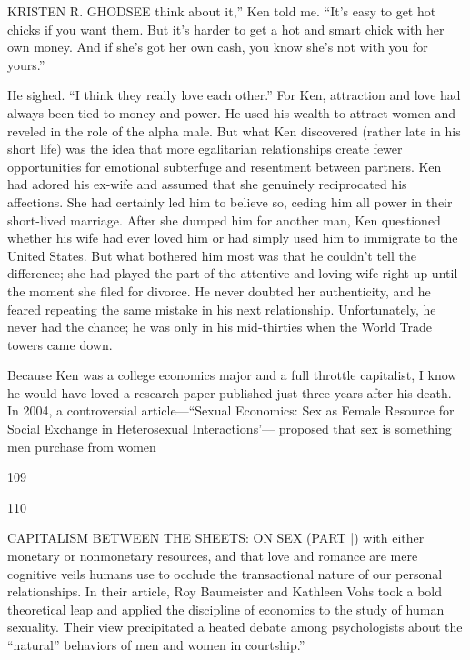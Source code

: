  \par 
KRISTEN R. GHODSEE think about it,” Ken told me. “It’s easy to get hot chicks if you want them. But it’s harder to get a hot and smart chick with her own money. And if she’s got her own cash, you know she’s not with you for yours.”
 \par 
He sighed. “I think they really love each other.” For Ken, attraction and love had always been tied to money and power. He used his wealth to attract women and reveled in the role of the alpha male. But what Ken discovered (rather late in his short life) was the idea that more egalitarian relationships create fewer opportunities for emotional subterfuge and resentment between partners. Ken had adored his ex-wife and assumed that she genuinely reciprocated his affections. She had certainly led him to believe so, ceding him all power in their short-lived marriage. After she dumped him for another man, Ken questioned whether his wife had ever loved him or had simply used him to immigrate to the United States. But what bothered him most was that he couldn’t tell the difference; she had played the part of the attentive and loving wife right up until the moment she filed for divorce. He never doubted her authenticity, and he feared repeating the same mistake in his next relationship. Unfortunately, he never had the chance; he was only in his mid-thirties when the World Trade towers came down.
 \par 
Because Ken was a college economics major and a full throttle capitalist, I know he would have loved a research paper published just three years after his death. In 2004, a controversial article—“Sexual Economics: Sex as Female Resource for Social Exchange in Heterosexual Interactions’— proposed that sex is something men purchase from women
 \par 
109
 \par 
110
 \par 
CAPITALISM BETWEEN THE SHEETS: ON SEX (PART |) with either monetary or nonmonetary resources, and that love and romance are mere cognitive veils humans use to occlude the transactional nature of our personal relationships. In their article, Roy Baumeister and Kathleen Vohs took a bold theoretical leap and applied the discipline of economics to the study of human sexuality. Their view precipitated a heated debate among psychologists about the “natural” behaviors of men and women in courtship.”
 \par 
